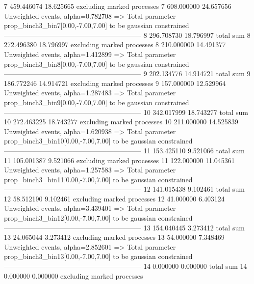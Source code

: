 7          459.446074      18.625665       excluding marked processes    
7          608.000000      24.657656       Unweighted events, alpha=0.782708
  => Total parameter prop_binch3_bin7[0.00,-7.00,7.00] to be gaussian constrained
------------------------------------------------------------
8          296.708730      18.796997       total sum                     
8          272.496380      18.796997       excluding marked processes    
8          210.000000      14.491377       Unweighted events, alpha=1.412899
  => Total parameter prop_binch3_bin8[0.00,-7.00,7.00] to be gaussian constrained
------------------------------------------------------------
9          202.134776      14.914721       total sum                     
9          186.772246      14.914721       excluding marked processes    
9          157.000000      12.529964       Unweighted events, alpha=1.287483
  => Total parameter prop_binch3_bin9[0.00,-7.00,7.00] to be gaussian constrained
------------------------------------------------------------
10         342.017999      18.743277       total sum                     
10         272.463225      18.743277       excluding marked processes    
10         211.000000      14.525839       Unweighted events, alpha=1.620938
  => Total parameter prop_binch3_bin10[0.00,-7.00,7.00] to be gaussian constrained
------------------------------------------------------------
11         153.425110      9.521066        total sum                     
11         105.001387      9.521066        excluding marked processes    
11         122.000000      11.045361       Unweighted events, alpha=1.257583
  => Total parameter prop_binch3_bin11[0.00,-7.00,7.00] to be gaussian constrained
------------------------------------------------------------
12         141.015438      9.102461        total sum                     
12         58.512190       9.102461        excluding marked processes    
12         41.000000       6.403124        Unweighted events, alpha=3.439401
  => Total parameter prop_binch3_bin12[0.00,-7.00,7.00] to be gaussian constrained
------------------------------------------------------------
13         154.040445      3.273412        total sum                     
13         24.065044       3.273412        excluding marked processes    
13         54.000000       7.348469        Unweighted events, alpha=2.852601
  => Total parameter prop_binch3_bin13[0.00,-7.00,7.00] to be gaussian constrained
------------------------------------------------------------
14         0.000000        0.000000        total sum                     
14         0.000000        0.000000        excluding marked processes    
